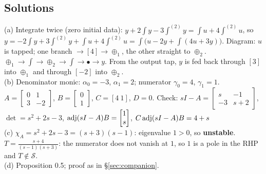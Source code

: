 \subsection{Solutions}
\begin{solbox}[title={M1 solutions}]
(a) Integrate twice (zero initial data): $y+2\int y-3\int^{(2)}y=\int u+4\int^{(2)}u$, so
$y=-2\int y+3\int^{(2)}y+\int u+4\int^{(2)}u=\int\Big(u-2y+\int(4u+3y)\Big)$.
Diagram: $u$ is tapped; one branch $\to[4]\to\oplus_1$, the other straight to $\oplus_2$. $\oplus_1\to\int\to\oplus_2\to\int\to\bullet\to y$. From the output tap, $y$ is fed back through $[3]$ into $\oplus_1$ and through $[-2]$ into $\oplus_2$.\\[1mm]
(b) Denominator monic: $\alpha_0=-3$, $\alpha_1=2$; numerator $\gamma_0=4$, $\gamma_1=1$.
$A=\begin{bmatrix}0&1\\3&-2\end{bmatrix}$, $B=\begin{bmatrix}0\\1\end{bmatrix}$, $C=[4\ 1]$, $D=0$.
Check: $sI-A=\begin{bmatrix}s&-1\\-3&s+2\end{bmatrix}$, $\det=s^2+2s-3$, $\operatorname{adj}(sI-A)B=\begin{bmatrix}1\\s\end{bmatrix}$, $C\operatorname{adj}(sI-A)B=4+s$ \checkmark\\[1mm]
(c) $\chi_A=s^2+2s-3=(s+3)(s-1)$: eigenvalue $1>0$, so \textbf{unstable}. $T=\frac{s+4}{(s-1)(s+3)}$: the numerator does not vanish at $1$, so $1$ is a pole in the RHP and $T\notin\mathcal S$.\\[1mm]
(d) Proposition 0.5; proof as in \S\ref{sec:companion}.
\end{solbox}
